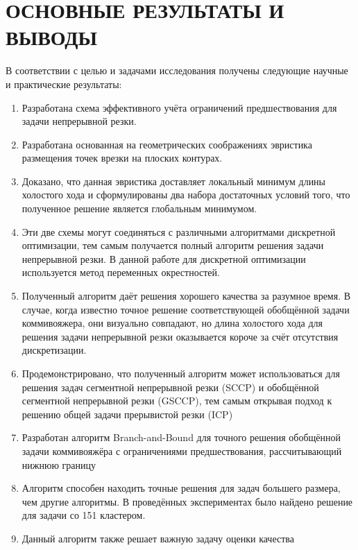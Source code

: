 
\section*{ОСНОВНЫЕ РЕЗУЛЬТАТЫ И ВЫВОДЫ}
В соответствии с целью и задачами исследования получены следующие
научные и практические результаты:

\begin{enumerate}
    \item 
    Разработана схема эффективного учёта ограничений предшествования для
    задачи непрерывной резки.
    \item 
    Разработана основанная на геометрических соображениях эвристика
    размещения точек врезки на плоских контурах.
    \item 
    Доказано, что данная эвристика доставляет локальный минимум длины холостого хода
    и сформулированы два набора достаточных условий того,
    что полученное решение является глобальным минимумом.
    \item 
    Эти две схемы могут соединяться с различными алгоритмами дискретной оптимизации,
    тем самым получается полный алгоритм решения задачи непрерывной резки.
    В данной работе для дискретной оптимизации используется
    метод переменных окрестностей.
    \item
    Полученный алгоритм даёт решения хорошего качества за разумное время. 
    В случае, когда известно точное решение соответствующей обобщённой
    задачи коммивояжера, они визуально совпадают, но длина холостого
    хода для решения задачи непрерывной резки оказывается короче за счёт
    отсутствия дискретизации.
    \item
    Продемонстрировано, что полученный алгоритм может использоваться для 
    решения задач сегментной непрерывной резки (SCCP) 
    и обобщённой сегментной непрерывной резки (GSCCP),
    тем самым открывая подход к решению общей задачи прерывистой резки
    (ICP)
    \item 
    Разработан алгоритм Branch-and-Bound для точного решения
    обобщённой задачи коммивояжёра с ограничениями предшествования,
    рассчитывающий нижнюю границу
    \item 
    Алгоритм способен находить точные решения для задач большего размера,
    чем другие алгоритмы. 
    В проведённых экспериментах было найдено решение для 
    задачи со 151 кластером.
    \item 
    Данный алгоритм также решает важную задачу оценки качества

\end{enumerate}
